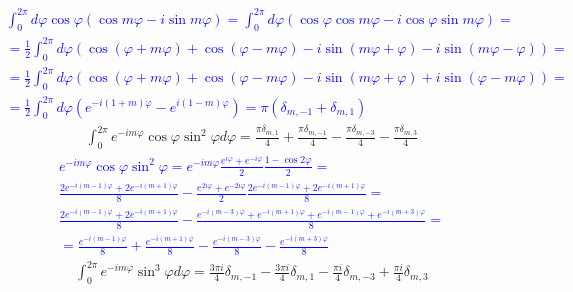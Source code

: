 \textcolor{blue}{ \begin{equation*} \begin{aligned}
\int_{0}^{2\pi} d \varphi \cos \varphi 
\left( \cos m \varphi - i \sin m \varphi \right) = \int_{0}^{2\pi} d \varphi
\left( \cos \varphi \cos m \varphi - i \cos \varphi \sin m \varphi \right) = \\
= \frac{1}{2} \int_{0}^{2\pi} d \varphi \left( 
\cos (\varphi + m \varphi) + \cos (\varphi - m \varphi) - 
i \sin (m \varphi + \varphi) - i \sin (m \varphi - \varphi) \right) = \\
= \frac{1}{2} \int_{0}^{2\pi} d \varphi \left( 
\cos (\varphi + m \varphi) + \cos (\varphi - m \varphi) - 
i \sin (m \varphi + \varphi) + i \sin (\varphi - m \varphi) \right) = \\
= \frac{1}{2} \int_{0}^{2\pi} d \varphi 
\left( e^{-i (1 + m) \varphi} - e^{i (1 - m) \varphi} \right) = 
\pi \left( \delta_{m,-1} + \delta_{m,1} \right)
\end{aligned} \end{equation*} }
%
\begin{equation} \begin{aligned} \label{eq:int_exp3}
\int_0^{2\pi} e^{-i m \varphi} \cos \varphi \sin^2 \varphi d \varphi = 
\frac{\pi \delta_{m,1} }{4} + \frac{\pi \delta_{m,-1} }{4} - 
\frac{\pi \delta_{m,-3} }{4} - \frac{\pi \delta_{m,3} }{4}
\end{aligned} \end{equation}
%
\textcolor{blue}{ \begin{equation*} \begin{aligned}
e^{-i m \varphi} \cos \varphi \sin^2 \varphi = e^{-i m \varphi} 
\frac{e^{i\varphi} + e^{-i\varphi}}{2} \frac{1 - \cos 2\varphi}{2} = \\
\frac{2e^{-i(m-1)\varphi} + 2e^{-i(m+1)\varphi}}{8} - 
\frac{e^{2i\varphi} + e^{-2i\varphi}}{2} 
\frac{2e^{-i(m-1)\varphi} + 2e^{-i(m+1)\varphi}}{8} = \\
\frac{2e^{-i(m-1)\varphi} + 2e^{-i(m+1)\varphi}}{8} - 
\frac{e^{-i(m-3)\varphi} + e^{-i(m+1)\varphi} + 
e^{-i(m-1)\varphi} + e^{-i(m+3)\varphi}}{8} = \\
= \frac{e^{-i(m-1)\varphi}}{8} + \frac{e^{-i(m+1)\varphi}}{8} -
\frac{e^{-i(m-3)\varphi}}{8} - \frac{e^{-i(m+3)\varphi}}{8}
\end{aligned} \end{equation*} }
%
\begin{equation} \begin{aligned} \label{eq:int_exp4}
\int_{0}^{2\pi} e^{-i m \varphi} \sin^3 \varphi d \varphi = 
\frac{3 \pi i}{4} \delta_{m,-1} - \frac{3 \pi i}{4} \delta_{m,1} - 
\frac{\pi i}{4} \delta_{m,-3} + \frac{\pi i}{4} \delta_{m,3}
\end{aligned} \end{equation}
